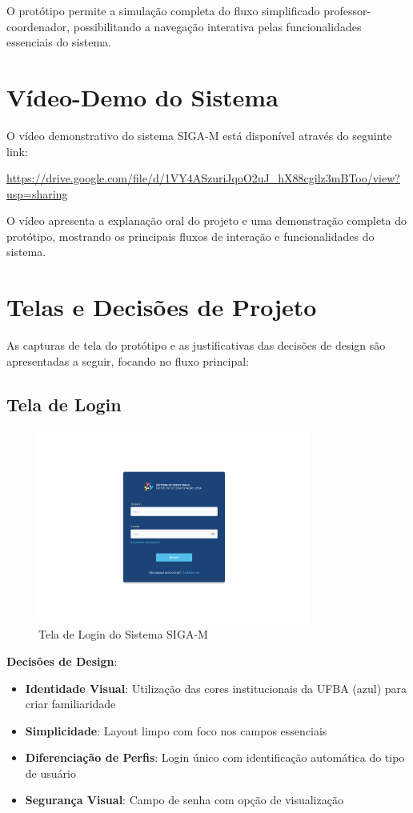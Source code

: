 \documentclass[12pt, a4paper]{report}
\begin{document}
O protótipo permite a simulação completa do fluxo simplificado professor-coordenador, possibilitando a navegação interativa pelas funcionalidades essenciais do sistema.

\section{Vídeo-Demo do Sistema}

O vídeo demonstrativo do sistema SIGA-M está disponível através do seguinte link:

\url{https://drive.google.com/file/d/1VY4ASzuriJqoO2uJ_hX88cgilz3mBToo/view?usp=sharing}

O vídeo apresenta a explanação oral do projeto e uma demonstração completa do protótipo, mostrando os principais fluxos de interação e funcionalidades do sistema.

\section{Telas e Decisões de Projeto}

As capturas de tela do protótipo e as justificativas das decisões de design são apresentadas a seguir, focando no fluxo principal:

\subsection{Tela de Login}

\begin{figure}[H]
\centering
\includegraphics[width=0.8\textwidth]{figma/Login.png}
\caption{Tela de Login do Sistema SIGA-M}
\label{fig:login}
\end{figure}

\textbf{Decisões de Design}:
\begin{itemize}
    \item \textbf{Identidade Visual}: Utilização das cores institucionais da UFBA (azul) para criar familiaridade
    \item \textbf{Simplicidade}: Layout limpo com foco nos campos essenciais
    \item \textbf{Diferenciação de Perfis}: Login único com identificação automática do tipo de usuário
    \item \textbf{Segurança Visual}: Campo de senha com opção de visualização
\end{itemize}
\end{document}
